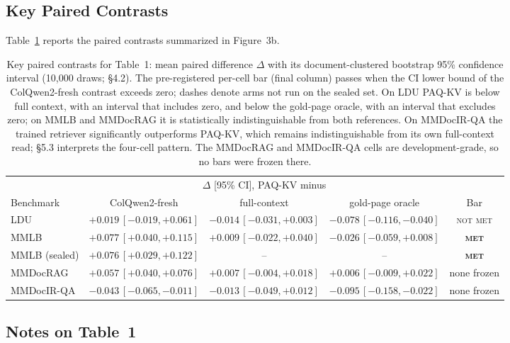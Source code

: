\documentclass[letterpaper]{article} %
\newcommand{\paqc}{\textsc{PAQ-KV}}
\begin{document}
\subsection{Key Paired Contrasts}\label{app:contrasts}

Table~\ref{tab:contrasts} reports the paired contrasts summarized in
Figure~3b.

\begin{table}[t]
\centering\scriptsize
\setlength{\tabcolsep}{3pt}
\begin{tabular}{lcccc}
\toprule
 & \multicolumn{3}{c}{$\Delta$ [95\% CI], \paqc{} minus} & \\
\cmidrule(lr){2-4}
Benchmark & ColQwen2-fresh & full-context & gold-page oracle & Bar \\
\midrule
LDU & $+0.019\,[-0.019,+0.061]$ & $-0.014\,[-0.031,+0.003]$ & $-0.078\,[-0.116,-0.040]$ & \textsc{not met} \\
MMLB & $+0.077\,[+0.040,+0.115]$ & $+0.009\,[-0.022,+0.040]$ & $-0.026\,[-0.059,+0.008]$ & \textbf{\textsc{met}} \\
MMLB (sealed) & $+0.076\,[+0.029,+0.122]$ & -- & -- & \textbf{\textsc{met}} \\
MMDocRAG & $+0.057\,[+0.040,+0.076]$ & $+0.007\,[-0.004,+0.018]$ & $+0.006\,[-0.009,+0.022]$ & none frozen \\
MMDocIR-QA & $-0.043\,[-0.065,-0.011]$ & $-0.013\,[-0.049,+0.012]$ & $-0.095\,[-0.158,-0.022]$ & none frozen \\
\bottomrule
\end{tabular}
\caption{Key paired contrasts for Table~1: mean paired
difference $\Delta$ with its document-clustered bootstrap 95\% confidence
interval (10{,}000 draws; \S4.2). The pre-registered
per-cell bar (final column) passes when the CI lower bound of the
ColQwen2-fresh contrast exceeds zero; dashes denote arms not run on the
sealed set. On LDU \paqc{} is below full context, with an interval
that includes zero, and below the gold-page oracle, with an interval that
excludes zero; on MMLB and MMDocRAG it is statistically
indistinguishable from both references. On MMDocIR-QA the trained retriever
significantly outperforms \paqc{}, which remains indistinguishable from its
own full-context read; \S5.3 interprets the
four-cell pattern. The MMDocRAG and MMDocIR-QA cells are development-grade,
so no bars were frozen there.}
\label{tab:contrasts}
\end{table}

\subsection{Notes on Table~1}\label{app:table1-notes}
\end{document}
